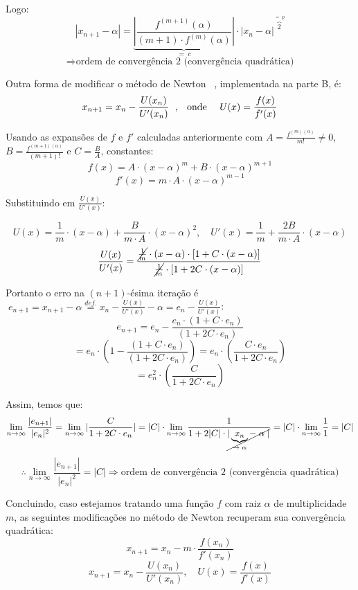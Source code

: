 \documentclass[12pt,a4paper,final]{article}
\begin{document}
Logo:
\[ | x_{n+1} - \alpha | =  \underbrace{|\frac{f^{(m+1)}(\alpha)}{(m+1) \cdot f^{(m)}(\alpha)}|
                           }_{= \; c} \cdot |x_n - \alpha|^{\overbrace{2}^{= \; p}} \]
\[ \Rightarrow \text{ordem de convergência 2 (convergência quadrática)} \]

Outra forma de modificar o método de Newton ~\cite[p.~353-356]{rabinowitz}, implementada na parte B, é:
\[ x_{n+1} = x_n - \frac{U(x_n)}{U'(x_n)} \text{\; , \; onde \quad} U(x) = \frac{f(x)}{f'(x)} \]

Usando as expansões de $ f $ e $ f' $ calculadas anteriormente com $ A = \frac{f^{(m)(\alpha)}}{m!} \neq 0 $,
$ B = \frac{f^{(m+1)(\alpha)}}{(m+1)!} $ e $ C = \frac{B}{A} $, constantes:
\[ f(x) = A \cdot (x - \alpha)^m + B \cdot (x - \alpha)^{m+1} \]
\[ f'(x) = m \cdot A \cdot (x - \alpha)^{m-1} \]

Substituindo em $ \frac{U(x)}{U'(x)} $:


\[ U(x) = \frac{1}{m} \cdot (x-\alpha) + \frac{B}{m \cdot A} \cdot (x-\alpha)^2, \quad
   U'(x) = \frac{1}{m} + \frac{2B}{m \cdot A} \cdot (x-\alpha) \]
\[ \frac{U(x)}{U'(x)} = \frac
   {\cancel{\frac{1}{m}} \cdot (x-\alpha) \cdot [1 + C \cdot (x-\alpha)]}
   {\cancel{\frac{1}{m}} \cdot [1 + 2C \cdot (x-\alpha)]} \]

Portanto o erro na $(n+1)$-ésima iteração é $ \; e_{n+1} = x_{n+1} - \alpha \overset{def.}{=} x_n - \frac{U(x)}{U'(x)} - \alpha = e_n - \frac{U(x)}{U'(x)}$:
\[ e_{n+1} = e_n - \frac{e_n \cdot (1 + C \cdot e_n)}{(1 + 2C \cdot e_n)} \]
\[ = e_n \cdot ( 1 - \frac{(1 + C \cdot e_n)}{(1 + 2C \cdot e_n)} )
   = e_n \cdot (\frac{C \cdot e_n}{1 + 2C \cdot e_n})\]
\[ = e_n^2 \cdot (\frac{C}{1 + 2C \cdot e_n})\]

Assim, temos que:
\[ \lim_{n \to \infty} \frac{|e_{n+1}|}{|e_n|^2} = \lim_{n \to \infty} |\frac{C}{1 + 2C \cdot e_n}|
   = |C| \cdot \lim_{n \to \infty} \frac{1}{1 + 2|C| \cdot
   \cancel{|\underbrace{x_n}_{\to \; \alpha}- \; \alpha \;|}} = |C| \cdot \lim_{n \to \infty} \frac{1}{1}
   = |C| \]
\[ \therefore \lim_{n \to \infty} \frac{|e_{n+1}|}{|e_n|^2} = |C| \Rightarrow
   \text{ordem de convergência 2 (convergência quadrática)} \]

Concluindo, caso estejamos tratando uma função $ f $ com raiz $ \alpha $ de multiplicidade $ m $, as
seguintes modificações no método de Newton recuperam sua convergência quadrática:
\[ x_{n+1} = x_n - m \cdot \frac{f(x_n)}{f'(x_n)} \]
\[ x_{n+1} = x_n - \frac{U(x_n)}{U'(x_n)} ,  \quad U(x) = \frac{f(x)}{f'(x)} \]
\end{document}
